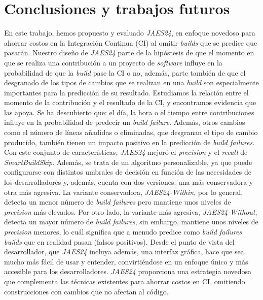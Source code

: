 \section{Conclusiones y trabajos futuros}
En este trabajo, hemos propuesto y evaluado \textit{JAES24}, en enfoque novedoso para ahorrar
costos en la Integración Continua (CI) al omitir \textit{builds} que se predice que pasarán.
Nuestro diseño de \textit{JAES24} parte de la hipóstesis de que el momento en que se realiza una
contribución a un proyecto de \textit{software} influye en la probabilidad de que la \textit{build}
pase la CI o no, además, parte también de que el desgranado de los tipos de cambios que se
realizan en una \textit{build} son especialmente importantes para la predicción de su resultado.
Estudiamos la relación entre el momento de la contribución y el resultado de la CI, y encontramos
evidencia que las apoya. Se ha descubierto que: el día, la hora o el tiempo entre contribuciones
influye en la probabilidad de predecir un \textit{build failure}. Además, otros cambios como el
número de líneas añadidas o eliminadas, que desgranan el tipo de cambio producido, también tienen
un impacto positivo en la predicción de \textit{build failures}.\\

Con este conjunto de características, \textit{JAES24} mejoró el \textit{precision} y el
\textit{recall} de \textit{SmartBuildSkip}. Además, se trata de un algoritmo personalizable, ya
que puede configurarse con distintos umbrales de decisión en función de las necesidades de los
desarrolladores y, además, cuenta con dos versiones: una más conservadora y otra más agresiva.
La variante conservadora, \textit{JAES24-Within}, por lo general, detecta un menor número de
\textit{build failures} pero mantiene unos niveles de \textit{precision} más elevados. Por otro
lado, la variante más agresiva, \textit{JAES24-Without}, detecta un mayor número de \textit{build
failures}, sin embargo, mantiene unos niveles de \textit{precision} menores, lo cuál significa que
a menudo predice como \textit{build failures} \textit{builds} que en realidad pasan (falsos positivos). Desde
el punto de vista del desarrollador, que \textit{JAES24} incluya además, una interfaz gráfica, hace
que sea mucho más fácil de usar y entender, convirtiéndose en un enfoque único y más accesible
para los desarrolladores. \textit{JAES24} proporciona una estrategia novedosa que complementa las
técnicas existentes para ahorrar costos en CI, omitiendo construcciones con cambios que no afectan
al código.\\

